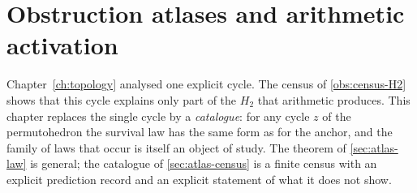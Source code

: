\chapter{Obstruction atlases and arithmetic activation}\label{ch:atlas}

Chapter~\ref{ch:topology} analysed one explicit cycle. The census of \cref{obs:census-H2} shows that this cycle explains only part of the $H_2$ that arithmetic produces. This chapter replaces the single cycle by a \emph{catalogue}: for any cycle $z$ of the permutohedron the survival law has the same form as for the anchor, and the family of laws that occur is itself an object of study. The theorem of \cref{sec:atlas-law} is general; the catalogue of \cref{sec:atlas-census} is a finite census with an explicit prediction record and an explicit statement of what it does not show.

